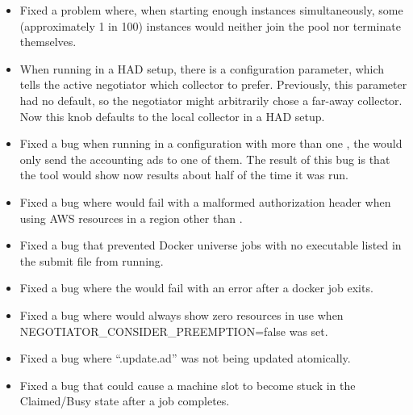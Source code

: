 \begin{itemize}

\item Fixed a problem where, when starting enough  instances
simultaneously, some (approximately 1 in 100) instances would neither join
the pool nor terminate themselves.

\item When running in a HAD setup, there is a configuration parameter,
 which tells the active negotiator
which collector to prefer.  Previously, this parameter had no default,
so the negotiator might arbitrarily chose a far-away collector.  Now
this knob defaults to the local collector in a HAD setup.

\item Fixed a bug when running in a configuration with more than one
, the  would only send the
accounting ads to one of them.  The result of this bug is that the
 tool would show now results about half of the time it
was run.

\item Fixed a bug where  would fail with a malformed
authorization header when using AWS resources in a region other than
.

\item Fixed a bug that prevented Docker universe jobs with no
executable listed in the submit file from running.

\item Fixed a bug where the  would fail with an error
after a docker job exits.

\item Fixed a bug where  would always show zero resources
in use when NEGOTIATOR\_CONSIDER\_PREEMPTION=false was set.

\item Fixed a bug where ``.update.ad'' was not being updated atomically.

\item Fixed a bug that could cause a machine slot to become stuck in the
Claimed/Busy state after a job completes.

\end{itemize}

